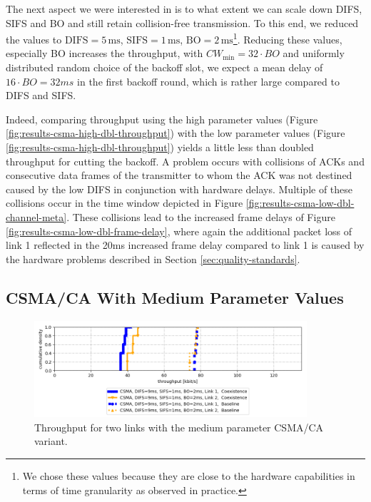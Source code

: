 The next aspect we were interested in is to what extent we can scale down DIFS, SIFS and BO and still retain collision-free transmission. To this end, we reduced the values to $\text{DIFS}=5 \,\text{ms}$, $\text{SIFS}=1 \,\text{ms}$, $\text{BO}=2 \,\text{ms}$\footnote{We chose these values because they are close to the hardware capabilities in terms of time granularity as observed in practice.}. Reducing these values, especially BO increases the throughput, with $CW_\text{min} = 32 \cdot BO$ and uniformly distributed random choice of the backoff slot, we expect a mean delay of $16\cdot BO=32ms$ in the first backoff round, which is rather large compared to DIFS and SIFS.

 Indeed, comparing throughput using the high parameter values (Figure \ref{fig:results-csma-high-dbl-throughput}) with the low parameter values (Figure \ref{fig:results-csma-high-dbl-throughput}) yields a little less than doubled throughput for cutting the backoff. 
 A problem occurs with collisions of ACKs and consecutive data frames of the transmitter to whom the ACK was not destined caused by the low DIFS in conjunction with hardware delays. Multiple of these collisions occur in the time window depicted in Figure \ref{fig:results-csma-low-dbl-channel-meta}. These collisions lead to the increased frame delays of Figure \ref{fig:results-csma-low-dbl-frame-delay}, where again the additional packet loss of link 1 reflected in the 20ms increased frame delay compared to link 1 is caused by the hardware problems described in Section \ref{sec:quality-standards}.

\clearpage

\subsection{CSMA/CA With Medium Parameter Values}

\begin{figure}[tb]
	\label{fig:results-csma-med-dbl-throughput}
	\begin{center}
		\includegraphics[width=0.9\textwidth]{pictures/results/same_combinations/csma_med_params/throughput_cdf}
	\end{center}
	\caption{Throughput for two links with the medium parameter CSMA/CA variant.}
\end{figure}

